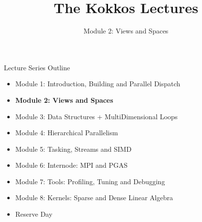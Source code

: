 
\def\sandid{SAND2020-7475 PE}

\title{The Kokkos Lectures}

\author{Module 2: Views and Spaces}




\shortfalse
\mediumtrue
\fulltrue
\notoverviewtrue



% 

\begin{frame}
	\titlepage
\end{frame}



\begin{frame}{Lecture Series Outline}

\begin{itemize}
        \item Module 1: Introduction, Building and Parallel Dispatch
        \item \textbf{Module 2: Views and Spaces}
        \item Module 3: Data Structures + MultiDimensional Loops
        \item Module 4: Hierarchical Parallelism
        \item Module 5: Tasking, Streams and SIMD
        \item Module 6: Internode: MPI and PGAS
        \item Module 7: Tools: Profiling, Tuning and Debugging
        \item Module 8: Kernels: Sparse and Dense Linear Algebra
        \item Reserve Day
\end{itemize}
\end{frame}


